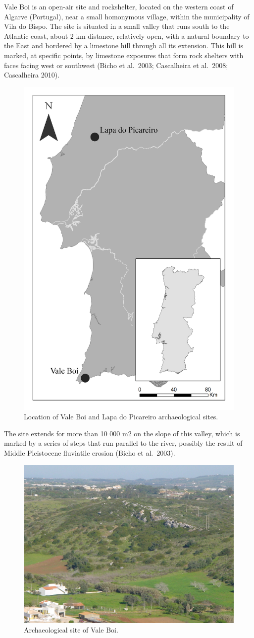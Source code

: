 \documentclass[12pt,twoside]{reedthesis}
\begin{document}
Vale Boi is an open-air site and rockshelter, located on the western coast of Algarve (Portugal), near a small homonymous village, within the municipality of Vila do Bispo. The site is situated in a small valley that runs south to the Atlantic coast, about 2 km distance, relatively open, with a natural boundary to the East and bordered by a limestone hill through all its extension. This hill is marked, at specific points, by limestone exposures that form rock shelters with faces facing west or southwest (Bicho et al.~2003; Cascalheira et al.~2008; Cascalheira 2010).
\begin{figure}

{\centering \includegraphics[width=0.5\linewidth]{figure/mapVB_LP} 

}

\caption{Location of Vale Boi and Lapa do Picareiro archaeological sites.}\label{fig:vbmap}
\end{figure}
The site extends for more than 10 000 m2 on the slope of this valley, which is marked by a series of steps that run parallel to the river, possibly the result of Middle Pleistocene fluviatile erosion (Bicho et al.~2003).
\begin{figure}

{\centering \includegraphics[width=0.5\linewidth]{figure/VB_site} 

}

\caption{Archaeological site of Vale Boi.}\label{fig:vbphoto}
\end{figure}
\end{document}
